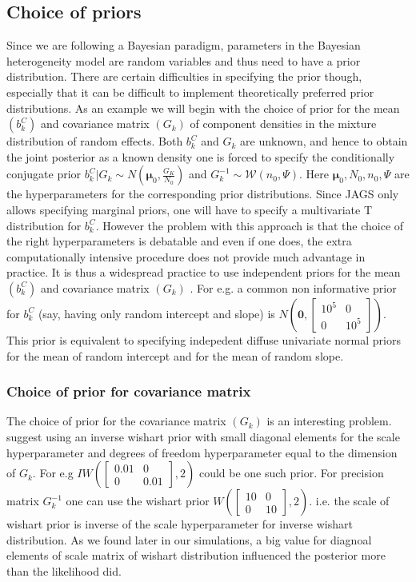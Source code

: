 \subsection{Choice of priors}
\label{subsec : choice_priors}
Since we are following a Bayesian paradigm, parameters in the Bayesian heterogeneity model are random variables and thus need to have a prior distribution. There are certain difficulties in specifying the prior though, especially that it can be difficult to implement theoretically preferred prior distributions. As an example we will begin with the choice of prior for the mean $(b_k^C)$ and covariance matrix $(G_k)$ of component densities in the mixture distribution of random effects. Both $b_k^C$ and $G_k$ are unknown, and hence to obtain the joint posterior as a known density one is forced to specify the conditionally conjugate prior $b_k^C | G_k \sim N(\boldsymbol{\mu}_0, \frac {G_K} {N_0})$ and $G_k^{-1} \sim \mathcal{W} (n_0, \Psi)$. Here $\boldsymbol{\mu}_0, N_0, n_0, \Psi$ are the hyperparameters for the corresponding prior distributions. Since JAGS only allows specifying marginal priors, one will have to specify a multivariate T distribution for $b_k^C$. However the problem with this approach is that the choice of the right hyperparameters is debatable \citep[pg. 192]{fruhwirth-schnatter_finite_2013} and even if one does, the extra computationally intensive procedure does not provide much advantage in practice. It is thus a widespread practice to use independent priors for the mean $(b_k^C)$ and covariance matrix $(G_k)$ \citep[chap. 17]{gelman_data_2006}. For e.g. a common non informative prior for $b_k^C$ (say, having only random intercept and slope) is $N(\boldsymbol{0}, \begin{bmatrix}10^5 & 0 \\ 0 & 10^5\end{bmatrix})$. This prior is equivalent to specifying indepedent diffuse univariate normal priors for the mean of random intercept and for the mean of random slope.

\subsubsection{Choice of prior for covariance matrix}
The choice of prior for the covariance matrix $(G_k)$ is an interesting problem. \citet[pg. 260]{lesaffre_bayesian_2012} suggest using an inverse wishart prior with small diagonal elements for the scale hyperparameter and degrees of freedom hyperparameter equal to the dimension of $G_k$. For e.g $IW(\begin{bmatrix}0.01 & 0 \\ 0 & 0.01\end{bmatrix}, 2)$ could be one such prior. For precision matrix $G_k^{-1}$ one can use the wishart prior $W(\begin{bmatrix}10 & 0 \\ 0 & 10\end{bmatrix}, 2)$. i.e. the scale of wishart prior is inverse of the scale hyperparameter for inverse wishart distribution. As we found later in our simulations, a big value for diagnoal elements of scale matrix of wishart distribution influenced the posterior more than the likelihood did.\\

